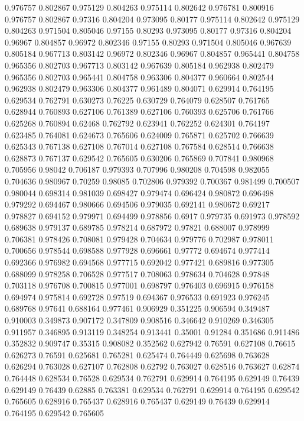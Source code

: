 0.976757 0.802867
0.975129 0.804263
0.975114 0.802642
0.976781 0.800916
0.976757 0.802867
0.97316 0.804204
0.973095 0.80177
0.975114 0.802642
0.975129 0.804263
0.971504 0.805046
0.97155 0.80293
0.973095 0.80177
0.97316 0.804204
0.96967 0.804857
0.96972 0.802346
0.97155 0.80293
0.971504 0.805046
0.967639 0.805184
0.967713 0.803142
0.96972 0.802346
0.96967 0.804857
0.965441 0.804758
0.965356 0.802703
0.967713 0.803142
0.967639 0.805184
0.962938 0.802479
0.965356 0.802703
0.965441 0.804758
0.963306 0.804377
0.960664 0.802544
0.962938 0.802479
0.963306 0.804377
0.961489 0.804071
0.629914 0.764195
0.629534 0.762791
0.630273 0.76225
0.630729 0.764079
0.628507 0.761765
0.628944 0.760893
0.627106 0.761389
0.627106 0.760393
0.625706 0.761766
0.625268 0.760894
0.62468 0.762792
0.623941 0.762252
0.624301 0.764197
0.623485 0.764081
0.624673 0.765606
0.624009 0.765871
0.625702 0.766639
0.625343 0.767138
0.627108 0.767014
0.627108 0.767584
0.628514 0.766638
0.628873 0.767137
0.629542 0.765605
0.630206 0.765869
0.707841 0.980968
0.705956 0.98042
0.706187 0.979393
0.707996 0.980208
0.704598 0.982055
0.704636 0.980967
0.70259 0.98085
0.702806 0.979392
0.700367 0.981499
0.700507 0.980044
0.698314 0.981039
0.698427 0.979474
0.696424 0.980872
0.696498 0.979292
0.694467 0.980666
0.694506 0.979035
0.692141 0.980672
0.69217 0.978827
0.694152 0.979971
0.694499 0.978856
0.6917 0.979735
0.691973 0.978592
0.689638 0.979137
0.689785 0.978214
0.687972 0.97821
0.688007 0.978999
0.706381 0.978426
0.708081 0.979428
0.704634 0.979776
0.702987 0.978011
0.700656 0.978544
0.698588 0.977928
0.696661 0.97772
0.694674 0.977414
0.692366 0.976982
0.694568 0.977715
0.692042 0.977421
0.689816 0.977305
0.688099 0.978258
0.706528 0.977517
0.708063 0.978634
0.704628 0.97848
0.703118 0.976708
0.700815 0.977001
0.698797 0.976403
0.696915 0.976158
0.694974 0.975814
0.692728 0.97519
0.694367 0.976533
0.691923 0.976245
0.689768 0.97641
0.688164 0.977461
0.906929 0.351225
0.906594 0.349487
0.910003 0.349873
0.907172 0.347809
0.908516 0.346642
0.910269 0.346305
0.911957 0.346895
0.913119 0.348254
0.913441 0.35001
0.91284 0.351686
0.911486 0.352832
0.909747 0.35315
0.908082 0.352562
0.627942 0.76591
0.627108 0.76615
0.626273 0.76591
0.625681 0.765281
0.625474 0.764449
0.625698 0.763628
0.626294 0.763028
0.627107 0.762808
0.62792 0.763027
0.628516 0.763627
0.62874 0.764448
0.628534 0.76528
0.629534 0.762791
0.629914 0.764195
0.629149 0.76439
0.629149 0.76439
0.62885 0.763381
0.629534 0.762791
0.629914 0.764195
0.629542 0.765605
0.628916 0.765437
0.628916 0.765437
0.629149 0.76439
0.629914 0.764195
0.629542 0.765605
